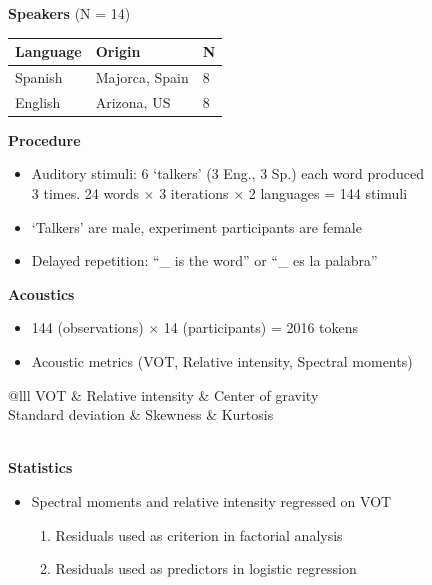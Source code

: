 \documentclass[a0paper,portrait,columns=2]{baposter}
\begin{document}
\begin{poster}
{\vspace{.1in}
\textbf{Speakers} (N = 14) 
\begin{center}
	\begin{tabular}{@{}lll@{}}
	\hline
	Language & Origin & N \\
	\hline
	Spanish  & Majorca, Spain &  8 \\
	English  & Arizona, US &  8 \\
	\hline
	\end{tabular}
\end{center}

\textbf{Procedure}
\vspace{.05in}
	\begin{itemize}
		\item Auditory stimuli: 6 `talkers' (3 Eng., 3 Sp.) each word produced \\ 3 times. 24 words $\times$ 3 iterations $\times$ 2 languages = 144 stimuli
		\item `Talkers' are male, experiment participants are female
		\item Delayed repetition: ``\_ is the word'' or ``\_ es la palabra''
	\end{itemize}

\vspace{.1in}
\textbf{Acoustics}
\vspace{.05in}
\begin{itemize}
	\item 144 (observations) $\times$ 14 (participants) = 2016 tokens
	\item Acoustic metrics (VOT, Relative intensity, Spectral moments)
\end{itemize}

\begin{center}
	\begin{tabular}{@{}lll}
	\hline
	VOT & Relative intensity & Center of gravity \\
	Standard deviation & Skewness & Kurtosis \\
	\hline
	\\
\end{tabular}
\end{center}

\textbf{Statistics}
\vspace{.05in} 

\begin{itemize}
	\item Spectral moments and relative intensity regressed on VOT
	\begin{enumerate}
		\item Residuals used as criterion in factorial analysis
		\item Residuals used as predictors in logistic regression
	\end{enumerate}
\end{itemize}


}
\end{poster}
\end{document}
